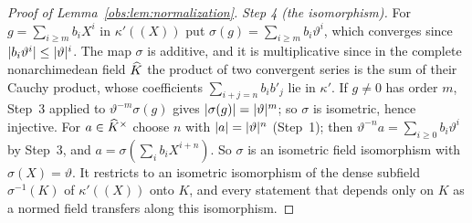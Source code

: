 \begin{proof}[Proof of Lemma~\ref{obs:lem:normalization}]
\emph{Step 4 (the isomorphism).} For $g=\sum_{i\ge m}b_iX^i$ in $\kappa'((X))$ put $\sigma(g)=\sum_{i\ge m}b_i\vartheta^i$,
which converges since $\lvert b_i\vartheta^i\rvert\le\lvert \vartheta\rvert^i$. The map $\sigma$ is additive, and it is multiplicative
since in the complete nonarchimedean field $\widehat K$ the product of two convergent series is the sum of their Cauchy
product, whose coefficients $\sum_{i+j=n}b_ib'_j$ lie in $\kappa'$. If $g\ne0$ has order $m$, Step~3 applied to
$\vartheta^{-m}\sigma(g)$ gives $\lvert \sigma(g)\rvert=\lvert \vartheta\rvert^m$; so $\sigma$ is isometric, hence injective. For
$a\in\widehat K^\times$ choose $n$ with $\lvert a\rvert=\lvert \vartheta\rvert^n$ (Step~1); then $\vartheta^{-n}a=\sum_{i\ge0}b_i\vartheta^i$ by
Step~3, and $a=\sigma(\sum_ib_iX^{i+n})$. So $\sigma$ is an isometric field isomorphism with $\sigma(X)=\vartheta$. It
restricts to an isometric isomorphism of the dense subfield $\sigma^{-1}(K)$ of $\kappa'((X))$ onto $K$, and every
statement that depends only on $K$ as a normed field transfers along this isomorphism.
\end{proof}

